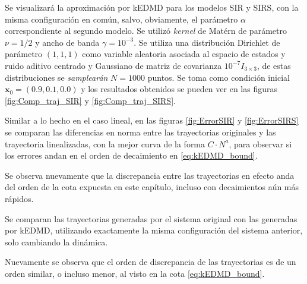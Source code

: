 Se visualizará la aproximación por kEDMD para los modelos SIR y SIRS, con la misma configuración en común, salvo, obviamente, el parámetro $\alpha$ correspondiente al segundo modelo. Se utilizó \textit{kernel} de Matérn de parámetro $\nu=1/2$ y ancho de banda $\gamma=10^{-3}$. Se utiliza una distribución Dirichlet de parámetro $(1,1,1)$ como variable aleatoria asociada al espacio de estados y ruido aditivo centrado y Gaussiano de matriz de covarianza $10^{-7} I_{3 \times 3}$, de estas distribuciones se \textit{samplearán} $N=1000$ puntos. Se toma como condición inicial $\mathbf{x}_0 = (0.9, 0.1, 0.0)$ y los resultados obtenidos se pueden ver en las figuras \ref{fig:Comp_traj_SIR} y \ref{fig:Comp_traj_SIRS}. 

Similar a lo hecho en el caso lineal, en las figuras \ref{fig:ErrorSIR} y \ref{fig:ErrorSIRS} se comparan las diferencias en norma entre las trayectorias originales y las trayectoria linealizadas, con la mejor curva de la forma $C \cdot N^{a}$, para observar si los errores andan en el orden de decaimiento en \eqref{eq:kEDMD_bound}.

Se observa nuevamente que la discrepancia entre las trayectorias en efecto anda del orden de la cota expuesta en este capítulo, incluso con decaimientos aún más rápidos.

Se comparan las trayectorias generadas por el sistema original con las generadas por kEDMD, utilizando exactamente la misma configuración del sistema anterior, solo cambiando la dinámica.

Nuevamente se observa que el orden de discrepancia de las trayectorias es de un orden similar, o incluso menor, al visto en la cota \ref{eq:kEDMD_bound}.